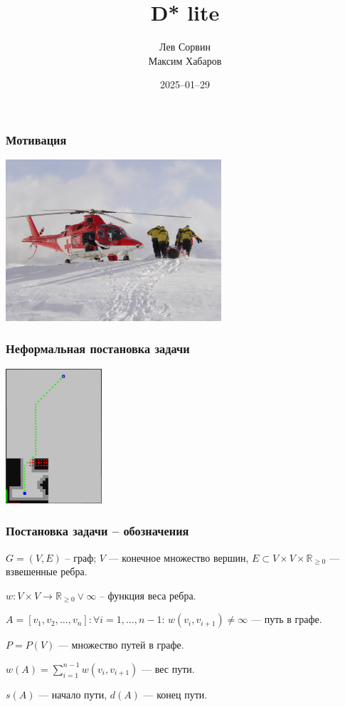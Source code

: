 \documentclass{beamer}
\title{D* lite}
\author{Лев Сорвин \\ Максим Хабаров}
\date{2025--01--29}
\newcommand{\realpositive}{\mathbb{R}_{\geqslant 0}}
\begin{document}
    \frame{\titlepage}
    \begin{frame}[fragile]
        \frametitle{Мотивация}
        \begin{center}
            \includegraphics[height=6cm]{../figures/medical-evacuation}
        \end{center}
    \end{frame}

    \begin{frame}[fragile]
        \frametitle{Неформальная постановка задачи}
        \begin{center}
            \includegraphics[height=5cm]{../figures/dstar8cells}
        \end{center}
    \end{frame}

    \begin{frame}[fragile]
        \frametitle{Постановка задачи -- обозначения}
        $G = (V, E)$ -- граф; $V$ --- конечное множество вершин, $E \subset V \times V \times \realpositive$ --- взвешенные ребра.

        $w: V \times V \rightarrow {\realpositive \lor \infty}$ -- функция веса ребра.

        $A = [v_1, v_2, \dots, v_n]: \forall i = 1, \dots, n-1$: $w(v_i, v_{i+1}) \neq \infty$  --- путь в графе.

        $P = P(V)$ --- множество путей в графе.

        $w(A) = \sum_{i = 1}^{n-1} w(v_i, v_{i+1})$ --- вес пути.

        $s(A)$ --- начало пути, $d(A)$ --- конец пути.

    \end{frame}
\end{document}
